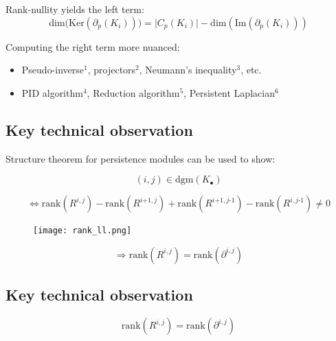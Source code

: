 \documentclass[
  letterpaper,
  DIV=11,
  numbers=noendperiod,
  oneside]{scrartcl}
\providecommand{\tightlist}{%
  \setlength{\itemsep}{0pt}\setlength{\parskip}{0pt}}\usepackage{longtable,booktabs,array}
\begin{document}
Rank-nullity yields the {left term}: \[
\mathrm{dim}\big(\mathrm{Ker}(\partial_p(K_i))\big) = \lvert C_p(K_i) \rvert - \mathrm{dim}(\mathrm{Im}(\partial_p(K_i)))
\]

Computing the {right term} more nuanced:

\begin{itemize}
\tightlist
\item
  Pseudo-inverse\(^1\), projectors\(^2\), Neumann's inequality\(^3\),
  etc.
\item
  PID algorithm\(^4\), Reduction algorithm\(^5\), Persistent
  Laplacian\(^6\)
\end{itemize}


\hypertarget{key-technical-observation}{%
\subsection{Key technical observation}\label{key-technical-observation}}

Structure theorem for persistence modules can be used to show:

\[ 
(i,j) \in \mathrm{dgm}(K_\bullet)
\]

\[
\Leftrightarrow \mathrm{rank}(R^{i,j}) - \mathrm{rank}(R^{i\texttt{+}1,j}) + \mathrm{rank}(R^{i\texttt{+}1,j\text{-}1}) - \mathrm{rank}(R^{i,j\text{-}1}) \neq 0
\]

\begin{figure}

{\centering \texttt{[image: rank\_ll.png]}

}

\end{figure}

\[
\Rightarrow \mathrm{rank}(R^{i,j}) = \mathrm{rank}(\partial^{i,j}) 
\]

\hypertarget{key-technical-observation-1}{%
\subsection{Key technical
observation}\label{key-technical-observation-1}}

\[
\mathrm{rank}(R^{i,j}) = \mathrm{rank}(\partial^{i,j}) 
\]
\end{document}
